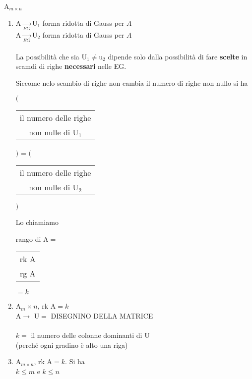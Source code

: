 A$_{m\times n}$
\begin{enumerate}
    \item A$\underset{EG}{\longrightarrow}$U$_1$ forma ridotta di Gauss per $A$\\
        A$\underset{EG}{\longrightarrow}$U$_2$ forma ridotta di Gauss per $A$\\\\
        La possibilità che sia U$_1\neq$u$_2$ dipende solo dalla possibilità di fare \textbf{scelte} 
        in scamdi di righe \textbf{necessari} nelle EG. 

        Siccome nelo scambio di righe non cambia il numero di righe non nullo si ha 
        \begin{center}
            $\Bigg($
               \begin{tabular}{c}
                   il numero delle righe\\
                   non nulle di U$_1$
               \end{tabular} 
            $\Bigg)$
            =
            $\Bigg($
               \begin{tabular}{c}
                   il numero delle righe\\
                   non nulle di U$_2$
               \end{tabular} 
            $\Bigg)$
        \end{center}
        Lo chiamiamo {\color{red}rango di A$=$
        \begin{tabular}{c}
            rk A\\
            rg A
        \end{tabular}
        }
        $=k$
    \item A$_m\times n$, rk A$=k$\\
        A$\longrightarrow$ U$=$ DISEGNINO DELLA MATRICE\\\\
        $k=$ il numero delle colonne dominanti di U \\
        (perché ogni gradino è alto una riga)
    \item A$_{m\times n}$, rk A$=k$. Si ha \\
        $k\leq m$ e $k \leq n$\\
        

\end{enumerate}
